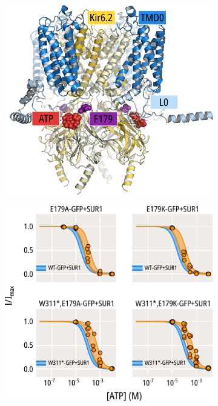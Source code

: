 \begin{figure}[h]
	\centering
	\begin{subfigure}[t]{0.45\textwidth}
		\caption{}\label{ch5fig:e179_loc}
		\centering
		\includegraphics[width=\textwidth]{e179_1.pdf}
	\end{subfigure}
	\hfill
	\begin{subfigure}[t]{0.45\textwidth}
		\caption{}\label{ch5fig:e179_atp_popfits}
		\centering
		\includegraphics[width=\textwidth]{e179_2.pdf}

\end{subfigure}
\end{figure}
